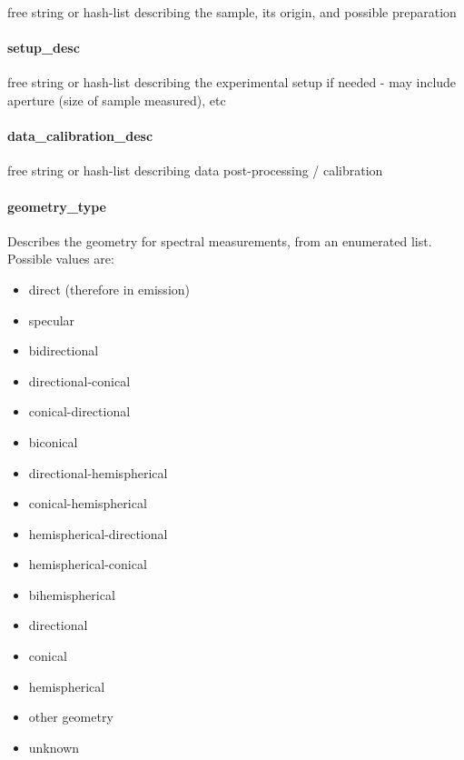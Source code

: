 \documentclass[11pt,a4paper]{ivoa}
\begin{document}
free string or hash-list describing the sample, its origin, and possible preparation

\paragraph{setup\_desc}

free string or hash-list describing the experimental setup if needed - may include aperture (size of sample measured), etc

\paragraph{data\_calibration\_desc}

free string or hash-list describing data post-processing / calibration

\paragraph{geometry\_type}

Describes the geometry for spectral measurements, from an enumerated list. Possible values are:

\begin{itemize}

\item direct (therefore in emission)

\item specular

\item bidirectional

\item directional-conical

\item conical-directional

\item biconical

\item directional-hemispherical

\item conical-hemispherical

\item hemispherical-directional

\item hemispherical-conical

\item bihemispherical

\item directional

\item conical

\item hemispherical

\item other geometry

\item unknown

\end{itemize}
\end{document}
